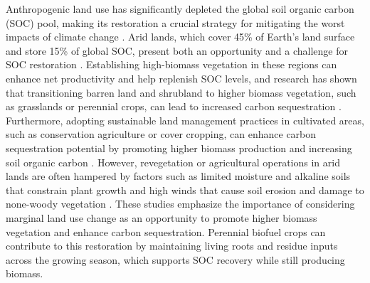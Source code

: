 \documentclass[11pt]{article}
\begin{document}
Anthropogenic land use has significantly depleted the global soil organic carbon (SOC) pool, making its restoration a crucial strategy for mitigating the worst impacts of climate change \citep{Lal2001SoilSequestration,Lal2004bClimateChange,Sanderman2017SoilCarbonDebt,Scharlemann2014GlobalSoilCarbon}. Arid lands, which cover 45\% of Earth’s land surface and store 15\% of global SOC, present both an opportunity and a challenge for SOC restoration \citep{Lal2004aDrylandEcosystems,Schimel2010Drylands}. Establishing high-biomass vegetation in these regions can enhance net productivity and help replenish SOC levels, and research has shown that transitioning barren land and shrubland to higher biomass vegetation, such as grasslands or perennial crops, can lead to increased carbon sequestration \citep{Arije2024SOCRecovery}. Furthermore, adopting sustainable land management practices in cultivated areas, such as conservation agriculture or cover cropping, can enhance carbon sequestration potential by promoting higher biomass production and increasing soil organic carbon \citep{Farage2007Placeholder,He2025Placeholder,Joshi2023Placeholder,Moukanni2022Placeholder}. However, revegetation or agricultural operations in arid lands are often hampered by factors such as limited moisture and alkaline soils that constrain plant growth and high winds that cause soil erosion and damage to none-woody vegetation \citep{DOdorico2012Placeholder,Naorem2023Placeholder}. These studies emphasize the importance of considering marginal land use change as an opportunity to promote higher biomass vegetation and enhance carbon sequestration. Perennial biofuel crops can contribute to this restoration by maintaining living roots and residue inputs across the growing season, which supports SOC recovery while still producing biomass.
\end{document}
